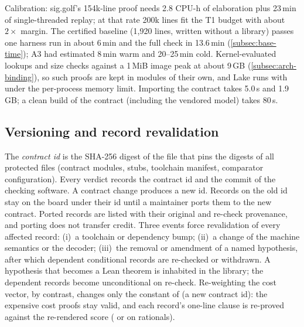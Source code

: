 \noindent Calibration: sig.golf's 154k-line proof needs 2.8 CPU-h of elaboration plus 23\,min of
single-threaded replay; at that rate 200k lines fit the T1 budget with about $2\times$ margin.
The certified baseline (1{,}920 lines, written without a library) passes one harness run in about
6\,min and the full check in 13.6\,min (\cref{subsec:base-time}); A3 had estimated 8\,min warm and
20--25\,min cold. Kernel-evaluated lookups and size checks against a 1\,MiB image peak at about
9\,GB (\cref{subsec:arch-binding}), so such proofs are kept in modules of their own, and Lake runs
with  under the per-process memory limit. Importing the contract takes
5.0\,s and 1.9\,GB; a clean build of the contract (including the vendored model) takes 80\,s.

\subsection{Versioning and record revalidation}\label{subsec:arch-versioning}

The \emph{contract id} is the SHA-256 digest of the file that pins the digests of all protected
files (contract modules, stubs, toolchain manifest, comparator configuration). Every verdict
records the contract id and the commit of the checking software. A contract change produces a new
id. Records on the old id stay on the board under their id until a maintainer ports them to the
new contract. Ported records are listed with their original and re-check provenance, and porting
does not transfer credit. Three events force revalidation of every affected record: (i)~a
toolchain or dependency bump; (ii)~a change of the machine semantics or the decoder; (iii)~the
removal or amendment of a named hypothesis, after which dependent conditional records are
re-checked or withdrawn. A hypothesis that becomes a Lean theorem is inhabited in the library;
the dependent records become unconditional on re-check. Re-weighting the cost vector, by contrast,
changes only the  constant of  (a new contract id): the expensive cost proofs stay valid,
and each record's one-line  clause is re-proved against the re-rendered score
( or  on rationals).
